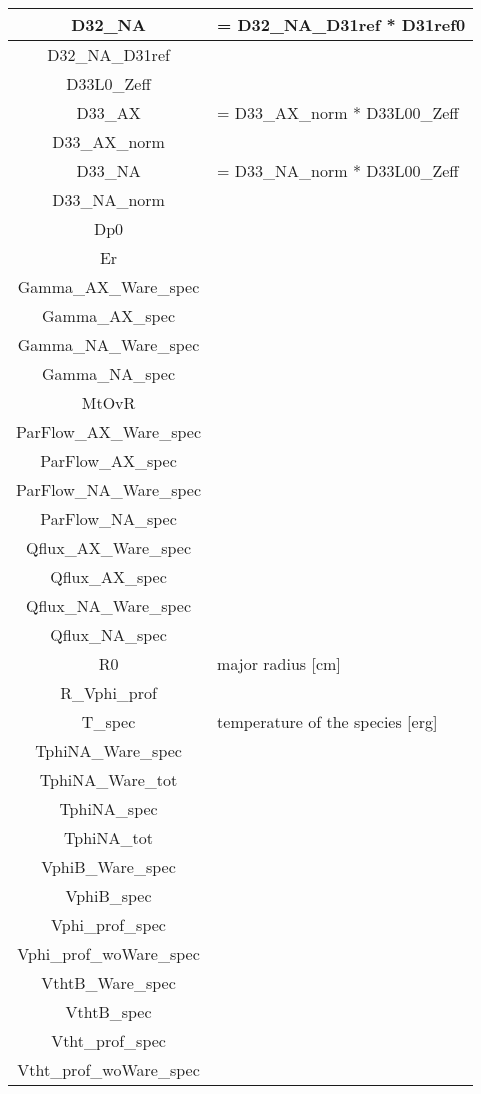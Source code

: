 \begin{table}[h]
\begin{tabular}{|c|l|}
\hline
D32\_NA & = D32\_NA\_D31ref * D31ref0 \\
\hline
D32\_NA\_D31ref & \\
\hline
D33L0\_Zeff & \\
\hline
D33\_AX & = D33\_AX\_norm * D33L00\_Zeff \\
\hline
D33\_AX\_norm & \\
\hline
D33\_NA & = D33\_NA\_norm * D33L00\_Zeff \\
\hline
D33\_NA\_norm & \\
\hline
Dp0 & \\
\hline
Er & \\
\hline
Gamma\_AX\_Ware\_spec & \\
\hline
Gamma\_AX\_spec & \\
\hline
Gamma\_NA\_Ware\_spec & \\
\hline
Gamma\_NA\_spec & \\
\hline
MtOvR & \\
\hline
ParFlow\_AX\_Ware\_spec & \\
\hline
ParFlow\_AX\_spec & \\
\hline
ParFlow\_NA\_Ware\_spec & \\
\hline
ParFlow\_NA\_spec & \\
\hline
Qflux\_AX\_Ware\_spec & \\
\hline
Qflux\_AX\_spec & \\
\hline
Qflux\_NA\_Ware\_spec & \\
\hline
Qflux\_NA\_spec & \\
\hline
R0 & major radius [cm] \\
\hline
R\_Vphi\_prof & \\
\hline
T\_spec & temperature of the species [erg] \\
\hline
TphiNA\_Ware\_spec & \\
\hline
TphiNA\_Ware\_tot & \\
\hline
TphiNA\_spec & \\
\hline
TphiNA\_tot & \\
\hline
VphiB\_Ware\_spec & \\
\hline
VphiB\_spec & \\
\hline
Vphi\_prof\_spec & \\
\hline
Vphi\_prof\_woWare\_spec & \\
\hline
VthtB\_Ware\_spec & \\
\hline
VthtB\_spec & \\
\hline
Vtht\_prof\_spec & \\
\hline
Vtht\_prof\_woWare\_spec & \\

\end{tabular}
\end{table}
